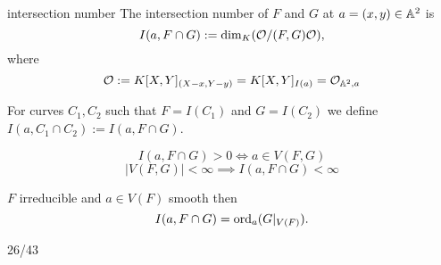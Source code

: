 \documentclass[twoside, a4paper, 12pt]{book}
\begin{document}
\begin{definition}{intersection number}{}
  The intersection number of $F$ and $G$ at $a=(x,y)\in \mathbb{A}^2$ is
  $$I(a, F\cap G):=\dim_K(\mathcal{O}/(F,G)\mathcal{O}),$$
  where 
  $$\mathcal{O}:=K[X,Y]_{(X-x, Y-y)}=K[X,Y]_{I(a)}=\mathcal{O}_{\mathbb{A}^2,a}$$

  For curves $C_1, C_2$ such that $F=I(C_1)$ and $G=I(C_2)$ we define $I(a, C_1\cap C_2):=I(a, F\cap G)$.
\end{definition}

$$I(a, F\cap G)>0\iff a\in V(F,G)$$
$$|V(F,G)|<\infty\implies I(a, F\cap G)<\infty$$
\begin{center}
  $F$ irreducible and $a\in V(F)$ smooth then 
  $$I(a, F\cap G)=\operatorname{ord}_a(G|_{V(F)}).$$
\end{center}

26/43
\end{document}
